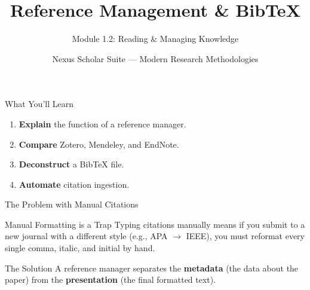 \documentclass[aspectratio=169]{beamer}
\title{Reference Management \& BibTeX}
\subtitle{Module 1.2: Reading \& Managing Knowledge}
\author{Nexus Scholar Suite --- Modern Research Methodologies}
\date{}
\begin{document}
\begin{frame}[plain]
  \titlepage
\end{frame}

\begin{frame}{What You'll Learn}
  \begin{enumerate}
    \item \textbf{Explain} the function of a reference manager.
    \item \textbf{Compare} Zotero, Mendeley, and EndNote.
    \item \textbf{Deconstruct} a BibTeX file.
    \item \textbf{Automate} citation ingestion.
  \end{enumerate}
\end{frame}

\begin{frame}{The Problem with Manual Citations}
  \begin{alertblock}{Manual Formatting is a Trap}
    Typing citations manually means if you submit to a new journal with a different style (e.g., APA $\rightarrow$ IEEE), you must reformat every single comma, italic, and initial by hand.
  \end{alertblock}
  \begin{exampleblock}{The Solution}
    A reference manager separates the \textbf{metadata} (the data about the paper) from the \textbf{presentation} (the final formatted text).
  \end{exampleblock}
\end{frame}
\end{document}
